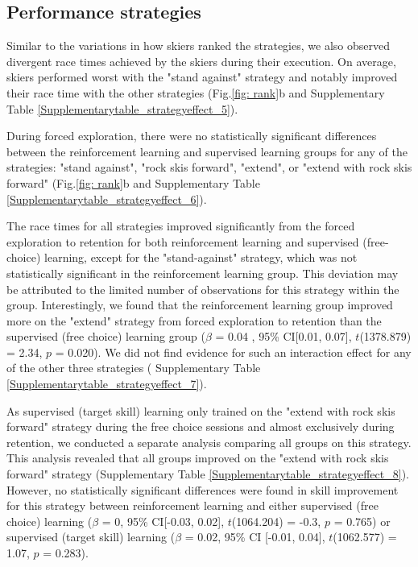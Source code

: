 \documentclass[pdflatex,sn-mathphys-num]{sn-jnl}%
\theoremstyle{thmstyleone}%
\theoremstyle{thmstyletwo}%
\theoremstyle{thmstylethree}%
\begin{document}
\subsection{Performance strategies}\label{subsec5}
Similar to the variations in how skiers ranked the strategies, we also observed divergent race times achieved by the skiers during their execution. On average, skiers performed worst with the "stand against" strategy and notably improved their race time with the other strategies (Fig.\ref{fig: rank}b and Supplementary Table \ref{Supplementarytable_strategyeffect_5}). 

During forced exploration, there were no statistically significant differences between the reinforcement learning and supervised learning groups for any of the strategies:  "stand against", "rock skis forward", "extend", or "extend with rock skis forward" (Fig.\ref{fig: rank}b and Supplementary Table \ref{Supplementarytable_strategyeffect_6}). 

The race times for all strategies improved significantly from the forced exploration to retention for both reinforcement learning and supervised (free-choice) learning, except for the "stand-against" strategy, which was not statistically significant in the reinforcement learning group. This deviation may be attributed to the limited number of observations for this strategy within the group. Interestingly, we found that the reinforcement learning group improved more on the "extend" strategy from forced exploration to retention than the supervised (free choice) learning group ($\beta$ = 0.04 , 95\% CI[0.01, 0.07], $t$(1378.879) = 2.34, $p$ = 0.020). We did not find evidence for such an interaction effect for any of the other three strategies ( Supplementary Table \ref{Supplementarytable_strategyeffect_7}). 

As supervised (target skill) learning only trained on the "extend with rock skis forward" strategy during the free choice sessions and almost exclusively during retention, we conducted a separate analysis comparing all groups on this strategy. This analysis revealed that all groups improved on the "extend with rock skis forward" strategy  (Supplementary Table \ref{Supplementarytable_strategyeffect_8}). However, no statistically significant differences were found in skill improvement for this strategy between reinforcement learning and either supervised (free choice) learning ($\beta$ = 0, 95\% CI[-0.03, 0.02], $t$(1064.204) = -0.3, $p$ = 0.765) or supervised (target skill) learning ($\beta$ = 0.02, 95\% CI [-0.01, 0.04], $t$(1062.577) = 1.07, $p$ = 0.283).
\end{document}
